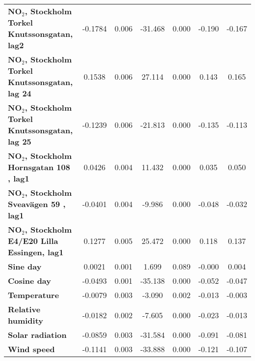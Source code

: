 \begin{landscape}
\begin{table}
\begin{center}
\begin{tabular}{lcccccc}
\textbf{NO$_2$, Stockholm Torkel Knutssonsgatan, lag2}   &      -0.1784  &        0.006     &   -31.468  &         0.000        &       -0.190    &       -0.167     \\
\textbf{NO$_2$, Stockholm Torkel Knutssonsgatan, lag 24} &       0.1538  &        0.006     &    27.114  &         0.000        &        0.143    &        0.165     \\
\textbf{NO$_2$, Stockholm Torkel Knutssonsgatan, lag 25} &      -0.1239  &        0.006     &   -21.813  &         0.000        &       -0.135    &       -0.113     \\
\textbf{NO$_2$, Stockholm Hornsgatan 108 , lag1}         &       0.0426  &        0.004     &    11.432  &         0.000        &        0.035    &        0.050     \\
\textbf{NO$_2$, Stockholm Sveavägen 59 , lag1}           &      -0.0401  &        0.004     &    -9.986  &         0.000        &       -0.048    &       -0.032     \\
\textbf{NO$_2$, Stockholm E4/E20 Lilla Essingen, lag1}   &       0.1277  &        0.005     &    25.472  &         0.000        &        0.118    &        0.137     \\
\textbf{Sine day}                                           &       0.0021  &        0.001     &     1.699  &         0.089        &       -0.000    &        0.004     \\
\textbf{Cosine day}                                         &      -0.0493  &        0.001     &   -35.138  &         0.000        &       -0.052    &       -0.047     \\
\textbf{Temperature}                                        &      -0.0079  &        0.003     &    -3.090  &         0.002        &       -0.013    &       -0.003     \\
\textbf{Relative humidity}                                  &      -0.0182  &        0.002     &    -7.605  &         0.000        &       -0.023    &       -0.013     \\
\textbf{Solar radiation}                                    &      -0.0859  &        0.003     &   -31.584  &         0.000        &       -0.091    &       -0.081     \\
\textbf{Wind speed}                                         &      -0.1141  &        0.003     &   -33.888  &         0.000        &       -0.121    &       -0.107     \\
\bottomrule
\end{tabular}
\begin{tabular}{lclc}

\end{tabular}
\end{center}
\end{table}
\end{landscape}
